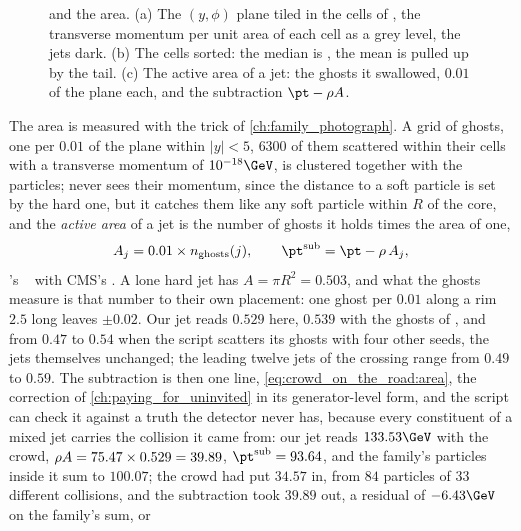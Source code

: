 \begin{figure}[htbp]\centering
\resizebox{\textwidth}{!}{}
\caption[\rhoPU and the area: the grid, the median, the ghosts]{\rhoPU
and the area. (a) The $(y,\phi)$ plane tiled in the cells of
, the transverse momentum per unit area of
each cell as a grey level, the jets dark. (b) The cells sorted: the
median is \rhoPU, the mean is pulled up by the tail. (c) The active area
of a jet: the ghosts it swallowed, $0.01$ of the plane each, and the
subtraction $\pt-\rhoPU A$.}
\label{fig:crowd_on_the_road:rho_sketch}
\end{figure}

The area is measured with the trick of \cref{ch:family_photograph}. A
grid of ghosts, one per $0.01$ of the plane within $|y|<5$, $6300$ of
them scattered within their cells with a transverse momentum of
$10^{-18}\GeV$, is clustered together with the particles; \antikt never
sees their momentum, since the distance to a soft particle is set by the
hard one, but it catches them like any soft particle within $R$ of the
core, and the \emph{active area} of a jet is the number of ghosts it
holds times the area of one,
\begin{equation}
  A_j=0.01\times n_{\mathrm{ghosts}}(j),\qquad
  \pt^{\mathrm{sub}}=\pt-\rhoPU\,A_j,
  \label{eq:crowd_on_the_road:area}
\end{equation}
\FASTJET's ~\cite{Cacciari:2008gn} with
CMS's . A lone hard \antikt jet has $A=\pi R^2=0.503$,
and what the ghosts measure is that number to their own placement: one
ghost per $0.01$ along a rim $2.5$ long leaves $\pm0.02$. Our jet reads
$0.529$ here, $0.539$ with the ghosts of \FASTJET, and from $0.47$ to
$0.54$ when the script scatters its ghosts with four other seeds, the
jets themselves unchanged;
the leading twelve jets of the crossing range from $0.49$ to $0.59$. The
subtraction is then one line, \cref{eq:crowd_on_the_road:area}, the
 correction of \cref{ch:paying_for_uninvited} in its
generator-level form, and the script can check it against a truth the
detector never has, because every constituent of a mixed jet carries the
collision it came from: our jet reads $133.53\GeV$ with the crowd,
$\rho A=75.47\times0.529=39.89$, $\pt^{\mathrm{sub}}=93.64$, and the
family's particles inside it sum to $100.07$; the crowd had put $34.57$
in, from $84$ particles of $33$ different collisions, and the subtraction
took $39.89$ out, a residual of $-6.43\GeV$ on the family's sum, or
